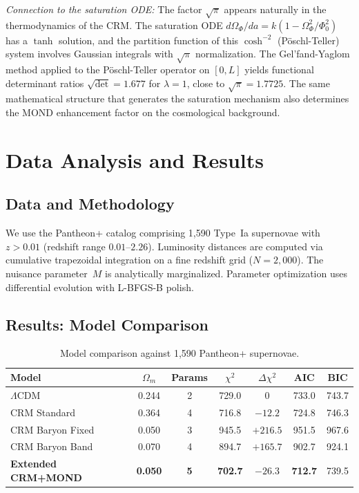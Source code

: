 \documentclass[aps,prd,twocolumn,superscriptaddress,nofootinbib]{revtex4-2}
\begin{document}
\textit{Connection to the saturation ODE:} The factor $\sqrt{\pi}$ appears naturally in the thermodynamics of the CRM. The saturation ODE $d\Omega_\Phi/da = k(1 - \Omega_\Phi^2/\Phi_0^2)$ has a $\tanh$ solution, and the partition function of this $\cosh^{-2}$ (P\"oschl-Teller) system involves Gaussian integrals with $\sqrt{\pi}$ normalization. The Gel'fand-Yaglom method applied to the P\"oschl-Teller operator on $[0,L]$ yields functional determinant ratios $\sqrt{\det} = 1.677$ for $\lambda = 1$, close to $\sqrt{\pi} = 1.7725$. The same mathematical structure that generates the saturation mechanism also determines the MOND enhancement factor on the cosmological background.


\section{Data Analysis and Results}
\label{sec:analysis}

\subsection{Data and Methodology}

We use the Pantheon+ catalog \cite{Scolnic2022} comprising 1,590 Type~Ia supernovae with $z > 0.01$ (redshift range $0.01$--$2.26$). Luminosity distances are computed via cumulative trapezoidal integration on a fine redshift grid ($N = 2{,}000$). The nuisance parameter~$M$ is analytically marginalized. Parameter optimization uses differential evolution with L-BFGS-B polish.

\subsection{Results: Model Comparison}

\begin{table}
\centering
\caption{Model comparison against 1,590 Pantheon+ supernovae.}
\label{tab:comparison}
\begin{tabular}{lcccccc}
\toprule
\textbf{Model} & $\Omega_m$ & \textbf{Params} & $\chi^2$ & $\Delta\chi^2$ & AIC & BIC \\
\midrule
$\Lambda$CDM & 0.244 & 2 & 729.0 & 0 & 733.0 & 743.7 \\
CRM Standard & 0.364 & 4 & 716.8 & $-12.2$ & 724.8 & 746.3 \\
\midrule
CRM Baryon Fixed & 0.050 & 3 & 945.5 & $+216.5$ & 951.5 & 967.6 \\
CRM Baryon Band & 0.070 & 4 & 894.7 & $+165.7$ & 902.7 & 924.1 \\
\midrule
\textbf{Extended CRM+MOND} & \textbf{0.050} & \textbf{5} & \textbf{702.7} & $\mathbf{-26.3}$ & \textbf{712.7} & 739.5 \\
\bottomrule
\end{tabular}
\end{table}
\end{document}
